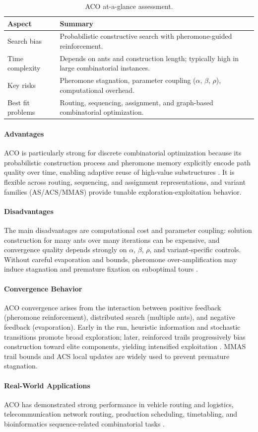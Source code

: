 \begin{table}[H]
\centering
\caption{ACO at-a-glance assessment.}
\label{tab:aco-profile}
\begin{tabular}{p{3.2cm} p{9.3cm}}
\hline
\textbf{Aspect} & \textbf{Summary} \\
\hline
Search bias & Probabilistic constructive search with pheromone-guided reinforcement. \\
Time complexity & Depends on ants and construction length; typically high in large combinatorial instances. \\
Key risks & Pheromone stagnation, parameter coupling ($\alpha$, $\beta$, $\rho$), computational overhead. \\
Best fit problems & Routing, sequencing, assignment, and graph-based combinatorial optimization. \\
\hline
\end{tabular}
\end{table}

\paragraph{Advantages}
ACO is particularly strong for discrete combinatorial optimization because its probabilistic construction process and pheromone memory explicitly encode path quality over time, enabling adaptive reuse of high-value substructures \autocite{DorigoBirattariStutzle2007}. It is flexible across routing, sequencing, and assignment representations, and variant families (AS/ACS/MMAS) provide tunable exploration-exploitation behavior.

\paragraph{Disadvantages}
The main disadvantages are computational cost and parameter coupling: solution construction for many ants over many iterations can be expensive, and convergence quality depends strongly on $\alpha$, $\beta$, $\rho$, and variant-specific controls. Without careful evaporation and bounds, pheromone over-amplification may induce stagnation and premature fixation on suboptimal tours \autocite{DorigoBirattariStutzle2007}.

\paragraph{Convergence Behavior}
ACO convergence arises from the interaction between positive feedback (pheromone reinforcement), distributed search (multiple ants), and negative feedback (evaporation). Early in the run, heuristic information and stochastic transitions promote broad exploration; later, reinforced trails progressively bias construction toward elite components, yielding intensified exploitation \autocite{DorigoBirattariStutzle2007}. MMAS trail bounds and ACS local updates are widely used to prevent premature stagnation.

\paragraph{Real-World Applications}
ACO has demonstrated strong performance in vehicle routing and logistics, telecommunication network routing, production scheduling, timetabling, and bioinformatics sequence-related combinatorial tasks \autocite{DorigoBirattariStutzle2007}.